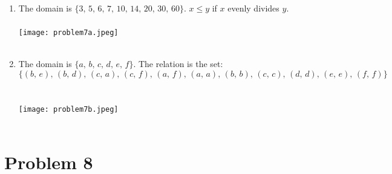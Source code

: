 \documentclass{amsart}
\theoremstyle{definition}
\theoremstyle{Exercise}
\theoremstyle{remark}
\theoremstyle{rule}
\numberwithin{equation}{section}
\begin{document}
\begin{enumerate}[label=(\alph*)]
\item The domain is $\{3,\, 5,\, 6,\, 7,\, 10,\, 14,\, 20,\, 30,\, 60\}$. $x \leq y$ if $x$ evenly divides $y$.\\\\

\texttt{[image: problem7a.jpeg]}\\\\

\item The domain is $\{a,\, b,\, c,\, d,\, e,\, f\}$. The relation is the set:
\[
\{ (b,\, e),\, (b,\, d),\, (c,\, a),\, (c,\, f),\, (a,\, f),\, (a,\, a),\, (b,\, b),\, (c, \,c),\, (d,\, d),\, (e, \,e), \,(f,\, f) \}
\]\\\\

\texttt{[image: problem7b.jpeg]}\\\\

\end{enumerate}

\newpage%

\section*{Problem 8}
\end{document}
